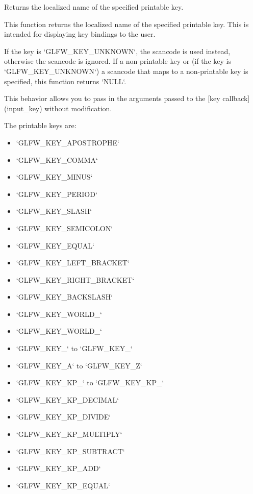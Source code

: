 Returns the localized name of the specified printable key. 

This function returns the localized name of the specified printable key. This is intended for displaying key bindings to the user.

If the key is `GLFW\_\-KEY\_\-UNKNOWN`, the scancode is used instead, otherwise the scancode is ignored. If a non-printable key or (if the key is `GLFW\_\-KEY\_\-UNKNOWN`) a scancode that maps to a non-printable key is specified, this function returns `NULL`.

This behavior allows you to pass in the arguments passed to the \mbox{[}key callback\mbox{]}(input\_\-key) without modification.

The printable keys are:\begin{itemize}
\item `GLFW\_\-KEY\_\-APOSTROPHE`\item `GLFW\_\-KEY\_\-COMMA`\item `GLFW\_\-KEY\_\-MINUS`\item `GLFW\_\-KEY\_\-PERIOD`\item `GLFW\_\-KEY\_\-SLASH`\item `GLFW\_\-KEY\_\-SEMICOLON`\item `GLFW\_\-KEY\_\-EQUAL`\item `GLFW\_\-KEY\_\-LEFT\_\-BRACKET`\item `GLFW\_\-KEY\_\-RIGHT\_\-BRACKET`\item `GLFW\_\-KEY\_\-BACKSLASH`\item `GLFW\_\-KEY\_\-WORLD\_`\item `GLFW\_\-KEY\_\-WORLD\_`\item `GLFW\_\-KEY\_` to `GLFW\_\-KEY\_`\item `GLFW\_\-KEY\_\-A` to `GLFW\_\-KEY\_\-Z`\item `GLFW\_\-KEY\_\-KP\_` to `GLFW\_\-KEY\_\-KP\_`\item `GLFW\_\-KEY\_\-KP\_\-DECIMAL`\item `GLFW\_\-KEY\_\-KP\_\-DIVIDE`\item `GLFW\_\-KEY\_\-KP\_\-MULTIPLY`\item `GLFW\_\-KEY\_\-KP\_\-SUBTRACT`\item `GLFW\_\-KEY\_\-KP\_\-ADD`\item `GLFW\_\-KEY\_\-KP\_\-EQUAL`\end{itemize}


